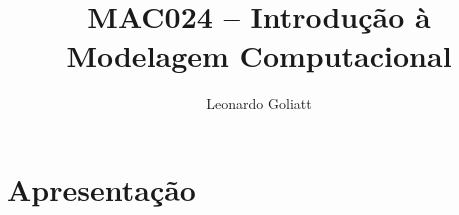 \documentclass[]{beamer}
\author{Leonardo Goliatt}
\title{MAC024 -- Introdução à Modelagem Computacional}
\date{}
\begin{document}
 
 \maketitle
 
\begin{frame}
\tableofcontents
\end{frame}

 

\section{Apresentação}

\end{document}

